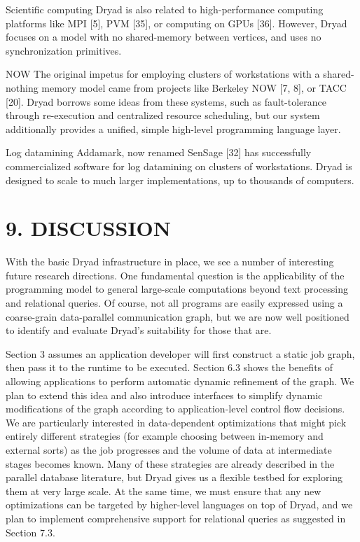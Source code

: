 \documentclass[
]{article}
\begin{document}
Scientific computing Dryad is also related to high-performance computing
platforms like MPI {[}5{]}, PVM {[}35{]}, or computing on GPUs {[}36{]}.
However, Dryad focuses on a model with no shared-memory between
vertices, and uses no synchronization primitives.

NOW The original impetus for employing clusters of workstations with a
shared-nothing memory model came from projects like Berkeley NOW {[}7,
8{]}, or TACC {[}20{]}. Dryad borrows some ideas from these systems,
such as fault-tolerance through re-execution and centralized resource
scheduling, but our system additionally provides a unified, simple
high-level programming language layer.

Log datamining Addamark, now renamed SenSage {[}32{]} has successfully
commercialized software for log datamining on clusters of workstations.
Dryad is designed to scale to much larger implementations, up to
thousands of computers.

\section{9. DISCUSSION}\label{discussion}

With the basic Dryad infrastructure in place, we see a number of
interesting future research directions. One fundamental question is the
applicability of the programming model to general large-scale
computations beyond text processing and relational queries. Of course,
not all programs are easily expressed using a coarse-grain data-parallel
communication graph, but we are now well positioned to identify and
evaluate Dryad's suitability for those that are.

Section 3 assumes an application developer will first construct a static
job graph, then pass it to the runtime to be executed. Section 6.3 shows
the benefits of allowing applications to perform automatic dynamic
refinement of the graph. We plan to extend this idea and also introduce
interfaces to simplify dynamic modifications of the graph according to
application-level control flow decisions. We are particularly interested
in data-dependent optimizations that might pick entirely different
strategies (for example choosing between in-memory and external sorts)
as the job progresses and the volume of data at intermediate stages
becomes known. Many of these strategies are already described in the
parallel database literature, but Dryad gives us a flexible testbed for
exploring them at very large scale. At the same time, we must ensure
that any new optimizations can be targeted by higher-level languages on
top of Dryad, and we plan to implement comprehensive support for
relational queries as suggested in Section 7.3.
\end{document}
